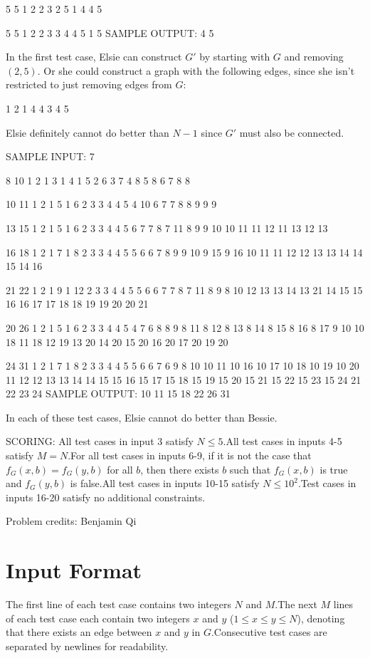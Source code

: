 \documentclass[12pt]{article}
\begin{document}
5 5
1 2
2 3
2 5
1 4
4 5

5 5
1 2
2 3
3 4
4 5
1 5
SAMPLE OUTPUT: 
4
5

In the first test case, Elsie can construct $G'$ by starting with $G$ and
removing  $(2,5)$. Or she could construct a graph with the following edges,
since she isn't restricted to just removing edges from $G$:


1 2
1 4
4 3
4 5

Elsie definitely cannot do better than $N-1$ since $G'$ must also be connected.

SAMPLE INPUT:
7

8 10
1 2
1 3
1 4
1 5
2 6
3 7
4 8
5 8
6 7
8 8

10 11
1 2
1 5
1 6
2 3
3 4
4 5
4 10
6 7
7 8
8 9
9 9

13 15
1 2
1 5
1 6
2 3
3 4
4 5
6 7
7 8
7 11
8 9
9 10
10 11
11 12
11 13
12 13

16 18
1 2
1 7
1 8
2 3
3 4
4 5
5 6
6 7
8 9
9 10
9 15
9 16
10 11
11 12
12 13
13 14
14 15
14 16

21 22
1 2
1 9
1 12
2 3
3 4
4 5
5 6
6 7
7 8
7 11
8 9
8 10
12 13
13 14
13 21
14 15
15 16
16 17
17 18
18 19
19 20
20 21

20 26
1 2
1 5
1 6
2 3
3 4
4 5
4 7
6 8
8 9
8 11
8 12
8 13
8 14
8 15
8 16
8 17
9 10
10 18
11 18
12 19
13 20
14 20
15 20
16 20
17 20
19 20

24 31
1 2
1 7
1 8
2 3
3 4
4 5
5 6
6 7
6 9
8 10
10 11
10 16
10 17
10 18
10 19
10 20
11 12
12 13
13 14
14 15
15 16
15 17
15 18
15 19
15 20
15 21
15 22
15 23
15 24
21 22
23 24
SAMPLE OUTPUT: 
10
11
15
18
22
26
31

In each of these test cases, Elsie cannot do better than Bessie.

SCORING:
All test cases in input 3 satisfy $N\le 5$.All test cases in inputs 4-5 satisfy $M=N$.For all test cases in inputs 6-9, if it is not the case that
$f_G(x,b)=f_G(y,b)$ for all $b$, then there exists $b$ such that $f_G(x,b)$ is
true and $f_G(y,b)$ is false.All test cases in inputs 10-15 satisfy $N\le 10^2$.Test cases in inputs 16-20 satisfy no additional constraints.


Problem credits: Benjamin Qi



\section*{Input Format}
The first line of each test case contains two integers $N$ and $M$.The next $M$ lines of each test case each contain two integers $x$ and $y$
($1\le x\le y\le N$), denoting that there exists an edge between $x$ and $y$ in
$G$.Consecutive test cases are separated by newlines for readability.
\end{document}

